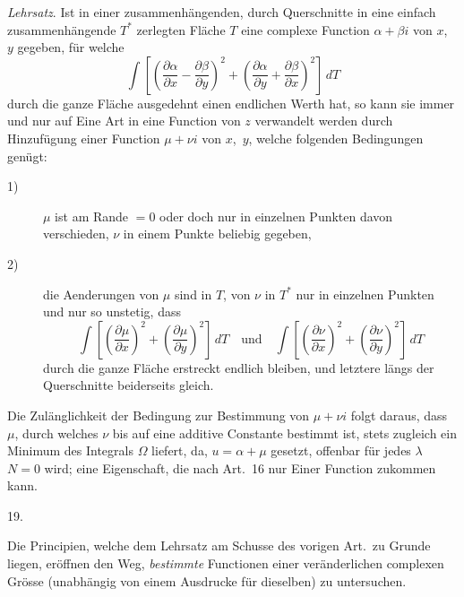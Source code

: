 \documentclass[a4paper,12pt]{article}
\begin{document}
\emph{Lehrsatz}.  Ist in einer zusammenh\"{a}ngenden, durch
Querschnitte in eine einfach zusammenh\"{a}ngende $T^*$ zerlegten
Fl\"{a}che $T$ eine complexe Function $\alpha + \beta i$ von
$x$,~$y$ gegeben, f\"{u}r welche
\[ \int
      \left[
         \left(
            \frac{\partial \alpha}{\partial x}
          - \frac{\partial \beta }{\partial y}
         \right)^2
       + \left(
            \frac{\partial \alpha}{\partial y}
          + \frac{\partial \beta }{\partial x}
         \right)^2
      \right] \, dT \]
durch die ganze Fl\"{a}che ausgedehnt einen endlichen Werth hat,
so kann sie immer und nur auf Eine Art in eine Function von $z$
verwandelt werden durch Hinzuf\"{u}gung einer Function
$\mu + \nu i$ von $x$,~$y$, welche folgenden Bedingungen
gen\"{u}gt:
\begin{description}

\item[\textmd{1)}]
$\mu$ ist am Rande $= 0$ oder doch nur in einzelnen Punkten davon
verschieden, $\nu$ in einem Punkte beliebig gegeben,

\item[\textmd{2)}]
die Aenderungen von $\mu$ sind in $T$, von $\nu$ in $T^*$ nur in
einzelnen Punkten und nur so unstetig, dass
\[ \int
      \left[
         \left( \frac{\partial \mu}{\partial x} \right)^2
       + \left( \frac{\partial \mu}{\partial y} \right)^2
      \right] \, dT
   \quad\mbox{und}\quad
   \int
      \left[
         \left( \frac{\partial \nu}{\partial x} \right)^2
       + \left( \frac{\partial \nu}{\partial y} \right)^2
      \right] \, dT \]
durch die ganze Fl\"{a}che erstreckt endlich bleiben, und
letztere l\"{a}ngs der Querschnitte beiderseits gleich.
\end{description}

Die Zul\"{a}nglichkeit der Bedingung zur Bestimmung von
$\mu + \nu i$ folgt daraus, dass $\mu$, durch welches $\nu$ bis
auf eine additive Constante bestimmt ist, stets zugleich ein
Minimum des Integrals $\Omega$ liefert, da, $u = \alpha + \mu$
gesetzt, offenbar f\"{u}r jedes $\lambda$ $N = 0$ wird; eine
Eigenschaft, die nach Art.~16 nur Einer Function zukommen kann.

\medbreak

\centerline{19.}

\nobreak\medskip

Die Principien, welche dem Lehrsatz am Schusse des vorigen
Art.\ zu Grunde liegen, er\"{o}ffnen den Weg, \emph{bestimmte}
Functionen einer ver\"{a}nderlichen complexen Gr\"{o}sse
(unabh\"{a}ngig von einem Ausdrucke f\"{u}r dieselben) zu
untersuchen.
\end{document}
